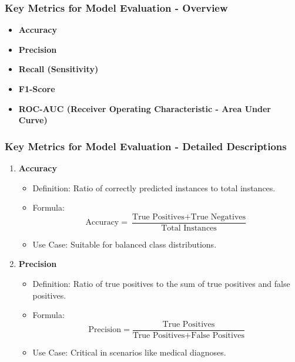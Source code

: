 \documentclass[aspectratio=169]{beamer}
\begin{document}
\begin{frame}[fragile]
    \frametitle{Key Metrics for Model Evaluation - Overview}
    \begin{itemize}
        \item \textbf{Accuracy}
        \item \textbf{Precision}
        \item \textbf{Recall (Sensitivity)}
        \item \textbf{F1-Score}
        \item \textbf{ROC-AUC (Receiver Operating Characteristic - Area Under Curve)}
    \end{itemize}
\end{frame}

\begin{frame}[fragile]
    \frametitle{Key Metrics for Model Evaluation - Detailed Descriptions}
    \begin{enumerate}
        \item \textbf{Accuracy}
            \begin{itemize}
                \item Definition: Ratio of correctly predicted instances to total instances.
                \item Formula: 
                \[
                \text{Accuracy} = \frac{\text{True Positives} + \text{True Negatives}}{\text{Total Instances}} 
                \]
                \item Use Case: Suitable for balanced class distributions.
            \end{itemize}
        \item \textbf{Precision}
            \begin{itemize}
                \item Definition: Ratio of true positives to the sum of true positives and false positives.
                \item Formula:
                \[
                \text{Precision} = \frac{\text{True Positives}}{\text{True Positives} + \text{False Positives}} 
                \]
                \item Use Case: Critical in scenarios like medical diagnoses.
            \end{itemize}
    \end{enumerate}
\end{frame}
\end{document}
